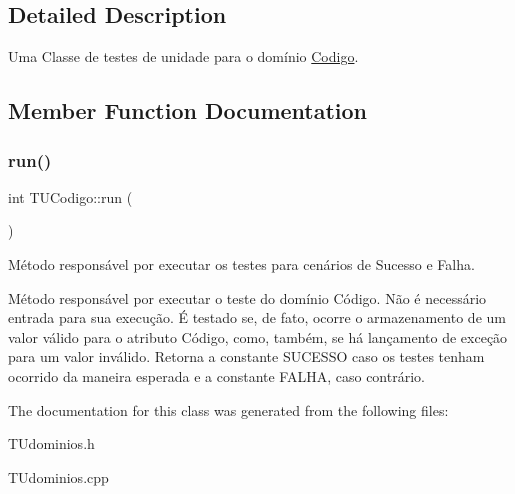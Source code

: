 \subsection{Detailed Description}
Uma Classe de testes de unidade para o domínio \hyperlink{classCodigo}{Codigo}. 

\subsection{Member Function Documentation}
\mbox{\label{classTUCodigo_a4e6994bcde0011cdf0b0bb7a2c4d94d9}} 
\subsubsection{\texorpdfstring{run()}{run()}}
{\footnotesize\ttfamily int T\+U\+Codigo\+::run (\begin{DoxyParamCaption}{ }\end{DoxyParamCaption})}



Método responsável por executar os testes para cenários de Sucesso e Falha. 

Método responsável por executar o teste do domínio Código. Não é necessário entrada para sua execução. É testado se, de fato, ocorre o armazenamento de um valor válido para o atributo Código, como, também, se há lançamento de exceção para um valor inválido. Retorna a constante S\+U\+C\+E\+S\+SO caso os testes tenham ocorrido da maneira esperada e a constante F\+A\+L\+HA, caso contrário. 

The documentation for this class was generated from the following files\+:\begin{DoxyCompactItemize}
\item 
T\+Udominios.\+h\item 
T\+Udominios.\+cpp\end{DoxyCompactItemize}
